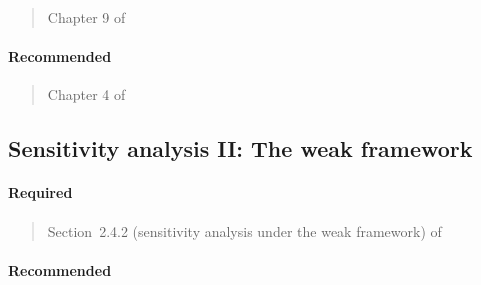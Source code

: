 \documentclass[12pt]{article}
\begin{document}
\begin{verse}
  Chapter 9 of 
\end{verse}

\begin{verse}  \end{verse}

\paragraph*{Recommended}

\begin{verse} Chapter 4 of  \end{verse}

\begin{verse}  \end{verse}

\begin{verse}  \end{verse}

\begin{verse}  \end{verse}

\begin{verse}  \end{verse}

\subsection{Sensitivity analysis II: The weak framework}

\paragraph*{Required}

\begin{verse} Section~2.4.2 (sensitivity analysis under the weak framework) of  \end{verse}

\begin{verse}  \end{verse}

\paragraph*{Recommended}
\end{document}
